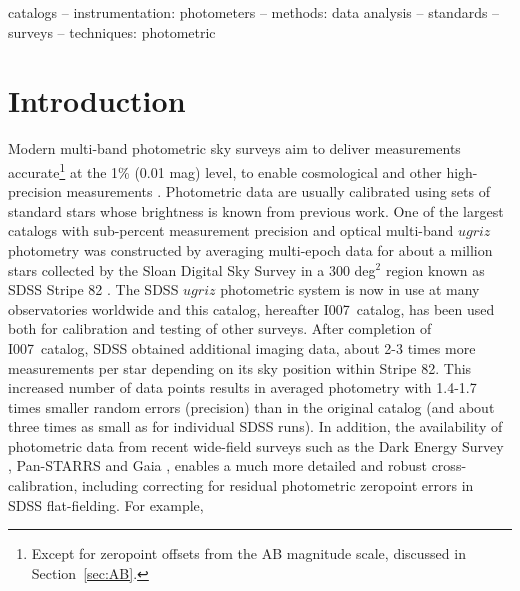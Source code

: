 \documentclass[fleqn,usenatbib]{mnras}
\newcommand{\pO}{\hbox{I007}}
\newcommand{\pOc}{\hbox{I007 catalog}}
\begin{document}
\begin{keywords}
catalogs -- instrumentation: photometers -- methods: data analysis -- standards -- surveys --
techniques: photometric
\end{keywords}



\section{Introduction} \label{sec:intro}

Modern multi-band photometric sky surveys aim to deliver measurements accurate\footnote{Except for zeropoint offsets from the AB magnitude scale, discussed in Section~\ref{sec:AB}.} at the 1\% (0.01 mag) level, to enable cosmological and other high-precision measurements \cite[e.g., the Vera Rubin Observatory Legacy Survey of Space and Time,][]{LSSToverview}. Photometric data are usually calibrated using sets of standard stars whose brightness is known from previous work. One of the largest catalogs with sub-percent measurement precision and optical multi-band $ugriz$ photometry
was constructed by averaging multi-epoch data for about a million stars collected by the Sloan Digital Sky Survey \citep[SDSS,][]{York2000}  in a 300 deg$^2$ region known as SDSS Stripe 82 \citep[][hereafter \pO]{Ivez07}. The SDSS $ugriz$ photometric system is now in use at many observatories worldwide and this catalog, hereafter \pOc, has been used both for calibration and testing of other surveys. 
After completion of \pOc, SDSS obtained additional imaging data, about 2-3 times more measurements 
per star depending on its sky position within Stripe 82. This increased number of data points results in averaged photometry with
1.4-1.7 times smaller random errors (precision) than in the original catalog (and about three times as small as for individual 
SDSS runs). In addition, the availability of photometric data from recent wide-field surveys such as the 
Dark Energy Survey \citep[DES,][]{2016MNRAS.460.1270D}, Pan-STARRS \citep[PS1,][]{2010SPIE.7733E..0EK} and Gaia \citep{GaiaCollab2018b}, enables a much more detailed and robust cross-calibration, including
correcting for residual photometric zeropoint errors in SDSS flat-fielding. For example, \cite{2013A&A...552A.124B}
\end{document}
